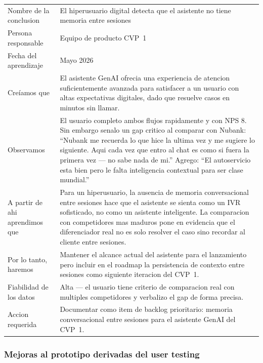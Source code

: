 \documentclass[12pt,a4paper]{article}
\begin{document}
\begin{center}
\begin{tabularx}{\linewidth}{L{3.5cm}X}
\toprule
{}
 \\
\midrule
Nombre de la conclusion & El hiperusuario digital detecta que el asistente no tiene memoria entre sesiones \\
Persona responsable & Equipo de producto CVP~1 \\
Fecha del aprendizaje & Mayo 2026 \\
Creíamos que & El asistente GenAI ofrecia una experiencia de atencion suficientemente
avanzada para satisfacer a un usuario con altas expectativas digitales, dado que
resuelve casos en minutos sin llamar. \\
Observamos & El usuario completo ambos flujos rapidamente y con NPS 8. Sin embargo
senalo un gap critico al comparar con Nubank: ``Nubank me recuerda lo que hice la
ultima vez y me sugiere lo siguiente. Aqui cada vez que entro al chat es como si
fuera la primera vez --- no sabe nada de mi.'' Agrego: ``El autoservicio esta bien
pero le falta inteligencia contextual para ser clase mundial.'' \\
A partir de ahi aprendimos que & Para un hiperusuario, la ausencia de memoria
conversacional entre sesiones hace que el asistente se sienta como un IVR
sofisticado, no como un asistente inteligente. La comparacion con competidores
mas maduros pone en evidencia que el diferenciador real no es solo resolver el
caso sino recordar al cliente entre sesiones. \\
Por lo tanto, haremos & Mantener el alcance actual del asistente para el lanzamiento
pero incluir en el roadmap la persistencia de contexto entre sesiones como
siguiente iteracion del CVP~1. \\
Fiabilidad de los datos & Alta --- el usuario tiene criterio de comparacion real
con multiples competidores y verbalizo el gap de forma precisa. \\
Accion requerida & Documentar como item de backlog prioritario: memoria
conversacional entre sesiones para el asistente GenAI del CVP~1. \\
\bottomrule
\end{tabularx}
\end{center}

\subsubsection{Mejoras al prototipo derivadas del user testing}
\end{document}
